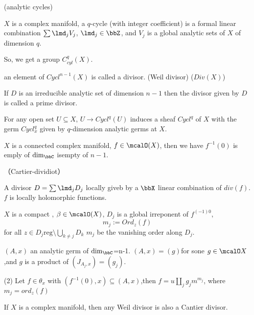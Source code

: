 \begin{definition}(analytic cycles)

$X$ is a complex manifold,  a $q$-cycle (with integer coefficient)
is a formal linear combination $\sum\limits\lmd_j V_j$, $\lmd_j\in\bbZ$,
and $V_j$ is a global analytic sets of $X$ of dimension $q$.
\end{definition}

So, we get a group $C_{cyl}^q(X)$.

an element of $Cycl^{n-1}(X)$ is called a divisor.
(Weil divisor)
($Div(X)$)

If $D$ is an irreducible analytic set of dimension $n-1$
then the divisor given by $D$ is called a prime divisor.

\begin{rem}
For any open set $U\subseteq X$, $U\to Cycl^q(U)$ induces a sheaf
$Cycl^q$ of $X$ with the germ $Cycl_x^q$ given by $q$-dimension analytic germs at $X$.
\end{rem}

\begin{thm}
$X$ is a connected complex manifold, $f\in\mcalO(X)$,
then we have $f^{-1}(0)$ is emply of $\dim_{\bbC}$ isempty of $n-1$.
\end{thm}


\begin{definition}（Cartier-dividiot）

A divisor $D=\sum\lmd_j D_j$ locally giveb by a $\bbX$ linear combination of $div(f)$.
$f$ is locally holomorphic functions.
\end{definition}

\begin{definition}
$X$ is a compact , $\beta\in\mcalO(X)$,
$D_j$ is a global irreponent of $f^{(-1)0}$,
$$m_j:=Ord_z(f)$$
for all $z\in D_j{\text{reg}}\setminus \bigcup_{k\neq j} D_k $
$m_j$ be the vanishing order along $D_j$.
\end{definition}

\begin{thm}
$(A,x)$ an analytic germ of $\dim_{\bbC}$=n-1.
$(A,x)=(g)$for sone $g\in \mcalO X$,and $g$ is a product of 
$(J_{A_j,x})=(g_j)$.

(2) Let $f\in\theta_x$ with $(f^{-1}(0),x)\subseteq(A,x)$,then
$f=u\coprod_j g_jm^{m_j}$, where $m_j=ord_z (f)$
\end{thm}

\begin{prop}If $X$ is a complex manifold, then any Weil divisor is
also a Cantier divisor. 
\end{prop}

